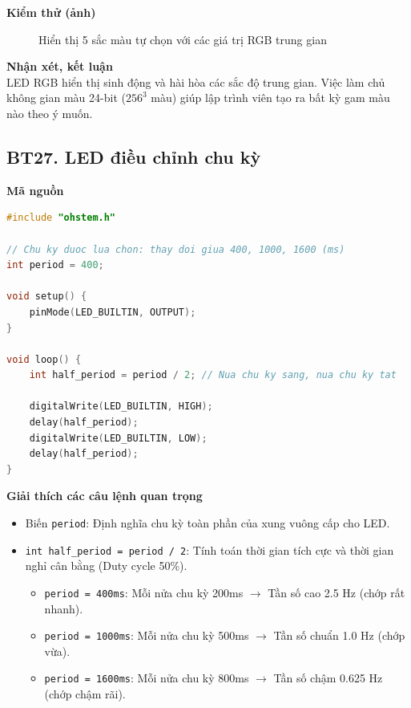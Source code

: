 \noindent\textbf{Kiểm thử (ảnh)}\\
\begin{figure}[H]
    \centering
    \caption{Hiển thị 5 sắc màu tự chọn với các giá trị RGB trung gian}
    \label{fig:bt26}
\end{figure}

\noindent\textbf{Nhận xét, kết luận}\\
LED RGB hiển thị sinh động và hài hòa các sắc độ trung gian. Việc làm chủ không gian màu 24-bit ($256^3$ màu) giúp lập trình viên tạo ra bất kỳ gam màu nào theo ý muốn.


\subsection*{BT27. LED điều chỉnh chu kỳ}

\noindent\textbf{Mã nguồn}\\
\begin{lstlisting}[language=C]
#include "ohstem.h"

// Chu ky duoc lua chon: thay doi giua 400, 1000, 1600 (ms)
int period = 400; 

void setup() {
    pinMode(LED_BUILTIN, OUTPUT);
}

void loop() {
    int half_period = period / 2; // Nua chu ky sang, nua chu ky tat

    digitalWrite(LED_BUILTIN, HIGH);
    delay(half_period);
    digitalWrite(LED_BUILTIN, LOW);
    delay(half_period);
}
\end{lstlisting}

\noindent\textbf{Giải thích các câu lệnh quan trọng}\\
\begin{itemize}
    \item Biến \texttt{period}: Định nghĩa chu kỳ toàn phần của xung vuông cấp cho LED.
    \item \texttt{int half\_period = period / 2}: Tính toán thời gian tích cực và thời gian nghỉ cân bằng (Duty cycle 50\%).
    \begin{itemize}
        \item \texttt{period = 400ms}: Mỗi nửa chu kỳ 200ms $\to$ Tần số cao 2.5 Hz (chớp rất nhanh).
        \item \texttt{period = 1000ms}: Mỗi nửa chu kỳ 500ms $\to$ Tần số chuẩn 1.0 Hz (chớp vừa).
        \item \texttt{period = 1600ms}: Mỗi nửa chu kỳ 800ms $\to$ Tần số chậm 0.625 Hz (chớp chậm rãi).
    \end{itemize}
\end{itemize}

